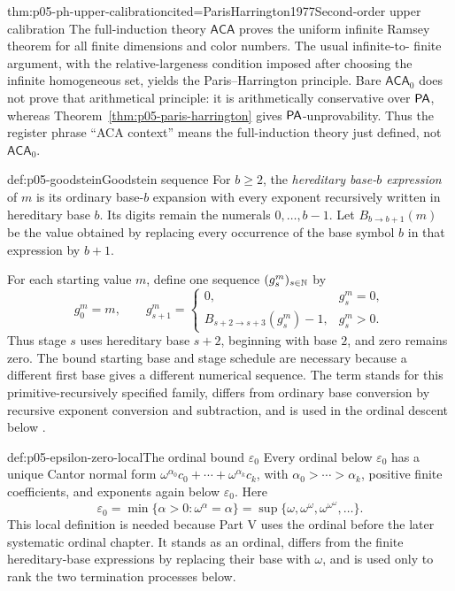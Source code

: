 \begin{hbtheorem}{thm:p05-ph-upper-calibration}{cited=ParisHarrington1977}{Second-order upper calibration}
The full-induction theory \(\mathsf{ACA}\) proves the uniform infinite Ramsey
theorem for all finite dimensions and color numbers.  The usual infinite-to-
finite argument, with the relative-largeness condition imposed after choosing
the infinite homogeneous set, yields the Paris--Harrington principle.
Bare \(\mathsf{ACA}_0\) does not prove that arithmetical principle: it is
arithmetically conservative over \(\mathsf{PA}\), whereas
Theorem~\ref{thm:p05-paris-harrington} gives \(\mathsf{PA}\)-unprovability.  Thus the
register phrase “ACA context” means the full-induction theory just defined,
not \(\mathsf{ACA}_0\).
\end{hbtheorem}

\begin{hbdefinition}{def:p05-goodstein}{Goodstein sequence}
For \(b\geq2\), the \emph{hereditary base-\(b\) expression} of \(m\) is its
ordinary base-\(b\) expansion with every exponent recursively written in
hereditary base \(b\).  Its digits remain the numerals \(0,\ldots,b-1\).  Let
\(B_{b\to b+1}(m)\) be the value obtained by replacing every occurrence of
the base symbol \(b\) in that expression by \(b+1\).

For each starting value \(m\), define one sequence \((g^m_s)_{s\in\mathbb{N}}\) by
\[
 g^m_0=m,\qquad
 g^m_{s+1}=
 \begin{cases}
   0, & g^m_s=0,\\
   B_{s+2\to s+3}(g^m_s)-1, & g^m_s>0.
 \end{cases}
\]
Thus stage \(s\) uses hereditary base \(s+2\), beginning with base \(2\), and
zero remains zero.  The bound starting base and stage schedule are necessary
because a different first base gives a different numerical sequence.  The
term stands for this primitive-recursively specified family, differs from
ordinary base conversion by recursive exponent conversion and subtraction,
and is used in the ordinal descent below \cite{Goodstein1944,KirbyParis1982}.
\end{hbdefinition}

\begin{hbdefinition}{def:p05-epsilon-zero-local}{The ordinal bound \(\varepsilon_0\)}
Every ordinal below \(\varepsilon_0\) has a unique Cantor normal form
\(\omega^{\alpha_0}c_0+\cdots+\omega^{\alpha_k}c_k\), with
\(\alpha_0>\cdots>\alpha_k\), positive finite coefficients, and exponents
again below \(\varepsilon_0\).  Here
\[
 \varepsilon_0=\min\{\alpha>0:\omega^\alpha=\alpha\}
 =\sup\{\omega,\omega^\omega,
          \omega^{\omega^\omega},\ldots\}.
\]
This local definition is needed because Part V uses the ordinal before the
later systematic ordinal chapter.  It stands as an ordinal, differs from the
finite hereditary-base expressions by replacing their base with \(\omega\),
and is used only to rank the two termination processes below.
\end{hbdefinition}

